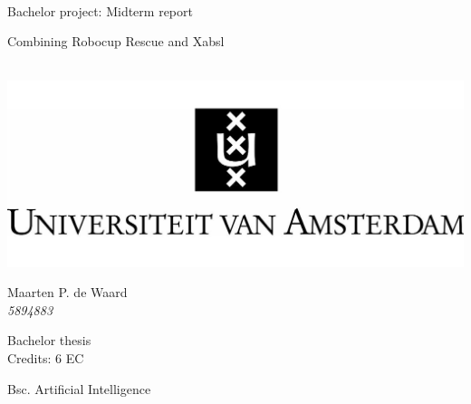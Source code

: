\begin{center}
\thispagestyle{empty}


\vspace{2.5cm}

\hrulefill\\
\begin{Huge}
Bachelor project: Midterm report\\
\end{Huge}
\vspace{0.2cm}
\begin{Large} 
Combining Robocup Rescue and Xabsl\\
\end{Large}
\hrulefill\\
\vspace{0.5cm}
\includegraphics[width=\textwidth]{uva.jpg}
\vspace{0.5cm}

{
\Large
Maarten P. de Waard\\\vspace{0.2cm}
\textit{5894883}
}

\vspace{1.5cm}

Bachelor thesis\\
Credits: 6 EC

\vspace{0.5cm}

Bsc. Artificial Intelligence

\vspace{0.25cm}


\end{center}

